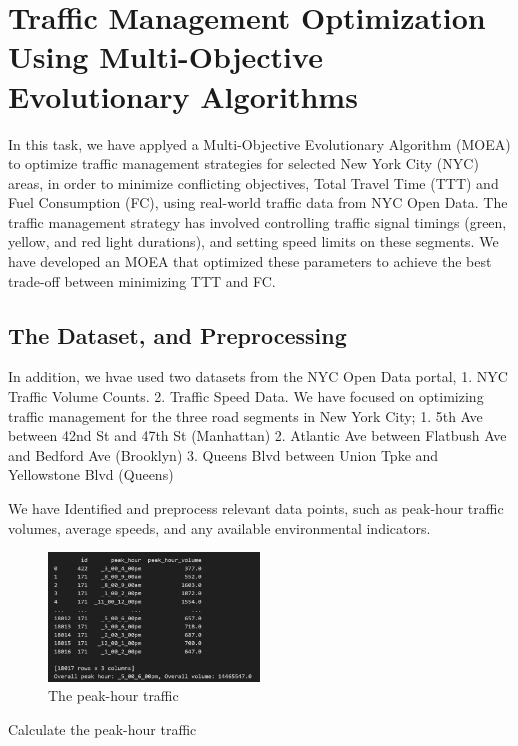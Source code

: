 \section{Traffic Management Optimization Using Multi-Objective Evolutionary Algorithms}

In this task, we have applyed a Multi-Objective Evolutionary Algorithm (MOEA) to optimize traffic management
strategies for selected New York City (NYC) areas, in order to  minimize conflicting
objectives, Total Travel Time (TTT) and Fuel Consumption (FC), using real-world traffic data
from NYC Open Data. The traffic management strategy has involved controlling traffic signal timings (green, yellow, and 
red light durations), and setting speed limits on these segments. We have developed an MOEA that optimized these parameters to achieve the best trade-off 
between minimizing TTT and FC.

\subsection{The Dataset, and Preprocessing}

In addition, we hvae used two datasets from the NYC Open Data portal,
1. NYC Traffic Volume Counts.
2. Traffic Speed Data.
We have focused on optimizing traffic management for the three road segments in New 
York City;  
1. 5th Ave between 42nd St and 47th St (Manhattan) 
2. Atlantic Ave between Flatbush Ave and Bedford Ave (Brooklyn) 
3. Queens Blvd between Union Tpke and Yellowstone Blvd (Queens) 

We have Identified and preprocess relevant data points, such as peak-hour traffic volumes, 
average speeds, and any available environmental indicators.

\begin{figure}[h]
    \centering
    \includegraphics[width=0.5\textwidth]{figures/peak_huours.PNG}
    \caption{The peak-hour traffic}
    \label{fig:sample}
\end{figure}


Calculate the peak-hour traffic

